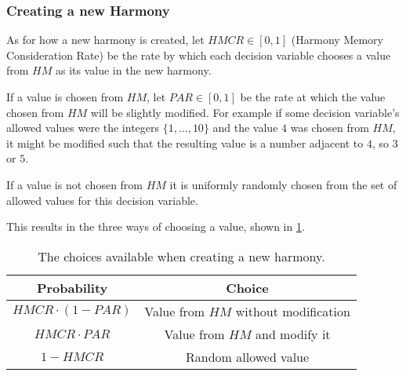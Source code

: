 \subsubsection{Creating a new Harmony}

As for how a new harmony is created, let $HMCR \in [0,1]$ (Harmony Memory Consideration Rate) be the rate by which each decision variable chooses a value from $HM$ as its value in the new harmony.

If a value is chosen from $HM$, let $PAR \in [0,1]$ be the rate at which the value chosen from $HM$ will be slightly modified.
For example if some decision variable's allowed values were the integers $\{1, \dots, 10\}$ and the value $4$ was chosen from $HM$, it might be modified such that the resulting value is a number adjacent to $4$, so $3$ or $5$.

If a value is not chosen from $HM$ it is uniformly randomly chosen from the set of allowed values for this decision variable.

This results in the three ways of choosing a value, shown in \cref{tab:04:hschoices}.

\begin{table}[t]
    \centering
    \begin{tabular}{|c|c|}\hline
        \textbf{Probability} & \textbf{Choice}\\ \hline
        $HMCR \cdot (1 - PAR)$ & Value from $HM$ without modification\\\hline
        $HMCR \cdot PAR$ & Value from $HM$ and modify it\\\hline
        $1 - HMCR$ & Random allowed value\\\hline 
    \end{tabular}
    \caption{The choices available when creating a new harmony.}
    \label{tab:04:hschoices}
\end{table}
